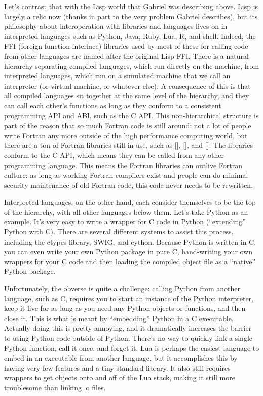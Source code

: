 \documentclass[12pt]{article}
\begin{document}
Let's contrast that with the Lisp world that Gabriel was describing above.
Lisp is largely a relic now (thanks in part to the very problem Gabriel
describes), but its philosophy about interoperation with libraries and
languages lives on in interpreted languages such as Python, Java, Ruby, Lua, R,
and shell. Indeed, the FFI (foreign function interface) libraries used by most
of these for calling code from other languages are named after the original
Lisp FFI. There is a natural hierarchy separating compiled languages, which run
directly on the machine, from interpreted languages, which run on a simulated
machine that we call an interpreter (or virtual machine, or whatever else). A
consequence of this is that all compiled languages sit together at the same
level of the hierarchy, and they can call each other's functions as long as
they conform to a consistent programming API and ABI, such as the C API.  This
non-hierarchical structure is part of the reason that so much Fortran code is
still around: not a lot of people write Fortran any more outside of the high
performance computing world, but there are a ton of Fortran libraries still in
use, such as [], [], and []. The libraries conform to the C API, which means
they can be called from any other programming language. This means the Fortran
libraries can outlive Fortran culture: as long as working Fortran compilers
exist and people can do minimal security maintenance of old Fortran code, this
code never needs to be rewritten.

Interpreted languages, on the other hand, each consider themselves to be the
top of the hierarchy, with all other languages below them. Let's take Python as
an example.  It's very easy to write a wrapper for C code in Python
(``extending'' Python with C). There are several different systems to assist
this process, including the ctypes library, SWIG, and cython. Because Python is
written in C, you can even write your own Python package in pure C,
hand-writing your own wrappers for your C code and then loading the compiled
object file as a ``native'' Python package.

Unfortunately, the obverse is quite a challenge: calling Python from another
language, such as C, requires you to start an instance of the Python
interpreter, keep it live for as long as you need any Python objects or
functions, and then close it. This is what is meant by ``embedding'' Python in
a C executable. Actually doing this is pretty annoying, and it dramatically
increases the barrier to using Python code outside of Python.  There's no way
to quickly link a single Python function, call it once, and forget it. Lua is
perhaps the easiest language to embed in an executable from another language,
but it accomplishes this by having very few features and a tiny standard
library. It also still requires wrappers to get objects onto and off of the Lua
stack, making it still more troublesome than linking .o files.
\end{document}
